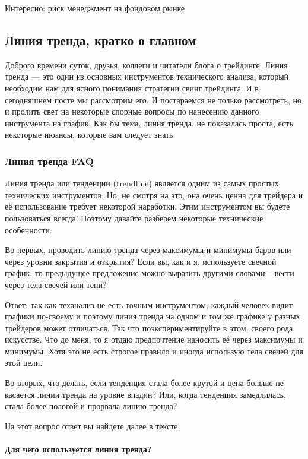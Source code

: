 \documentclass{book}
\begin{document}
Интересно: риск менеджмент на фондовом рынке

\subsection{Линия тренда, кратко о главном}

Доброго времени суток, друзья, коллеги и читатели блога о
трейдинге. Линия тренда — это один из основных инструментов
технического анализа, который необходим нам для ясного понимания
стратегии свинг трейдинга. И в сегодняшнем посте мы рассмотрим его. И
постараемся не только рассмотреть, но и пролить свет на некоторые
спорные вопросы по нанесению данного инструмента на график. Как бы
тема, линия тренда, не показалась проста, есть некоторые нюансы,
которые вам следует знать.

\subsubsection{Линия тренда FAQ }

Линия тренда или тенденции (trendline) является одним из самых простых технических инструментов. Но, не смотря на это, она очень ценна для трейдера и её использование требует некоторой наработки. Этим инструментом вы будете пользоваться всегда! Поэтому давайте разберем некоторые технические особенности.

Во-первых, проводить линию тренда через максимумы и минимумы баров или через уровни закрытия и открытия? Если вы, как и я, используете свечной график, то предыдущее предложение можно выразить другими словами – вести через тела свечей или тени?

Ответ: так как теханализ не есть точным инструментом, каждый человек видит графики по-своему и поэтому линия тренда  на одном и том же графике у разных трейдеров может отличаться. Так что поэкспериментируйте в этом, своего рода, искусстве. Что до меня, то я отдаю предпочтение наносить её через максимумы и минимумы. Хотя это не есть строгое правило и иногда использую тела свечей для этой цели.

Во-вторых,  что делать, если тенденция стала более крутой и цена больше не касается линии тренда на уровне впадин? Или, когда тенденция замедлилась, стала более пологой и прорвала линию тренда?

На этот вопрос ответ вы найдете далее в тексте.

\paragraph{Для чего используется линия тренда?}
\end{document}
